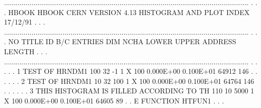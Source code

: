 \newpage
\begin{Listing}
 .............................................................................................................................
 .                                                                                                                           .
 .   HBOOK   HBOOK  CERN            VERSION   4.13       HISTOGRAM AND PLOT INDEX                             17/12/91       .
 .                                                                                                                           .
 .............................................................................................................................
 .                                                                                                                           .
 .  NO                     TITLE                      ID  B/C  ENTRIES DIM   NCHA     LOWER       UPPER       ADDRESS LENGTH .
 .                                                                                                                           .
 .............................................................................................................................
 .                                                                                                                           .
 .                                                                                                                           .
 .   1  TEST OF HRNDM1                               100  32       -1  1  X   100   0.000E+00   0.100E+01       64912    146 .
 .                                                                                                                           .
 .                                                                                                                           .
 .   2  TEST OF HRNDM1                                10  32      100  1  X   100   0.000E+00   0.100E+01       64764    146 .
 .                                                                                                                           .
 .                                                                                                                           .
 .   3  THIS HISTOGRAM IS FILLED ACCORDING TO TH     110  10     5000  1  X   100   0.000E+00   0.100E+01       64605     89 .
 .      E FUNCTION HTFUN1                                                                                                    .
 .                                                                                                                           .

\end{Listing}
